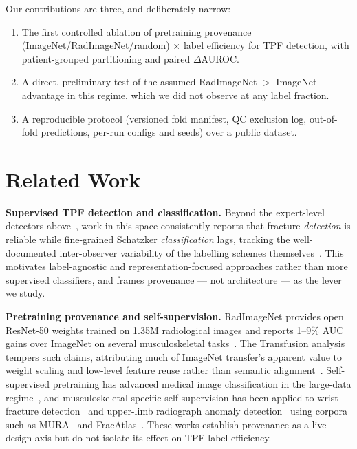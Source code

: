 \documentclass[conference]{IEEEtran}
\begin{document}
Our contributions are three, and deliberately narrow:
\begin{enumerate}
  \item The first controlled ablation of pretraining provenance
  (ImageNet/RadImageNet/random) $\times$ label efficiency for TPF detection, with
  patient-grouped partitioning and paired $\Delta$AUROC.
  \item A direct, preliminary test of the assumed RadImageNet $>$ ImageNet advantage
  in this regime, which we did not observe at any label fraction.
  \item A reproducible protocol (versioned fold manifest, QC exclusion log,
  out-of-fold predictions, per-run configs and seeds) over a public dataset.
\end{enumerate}

\section{Related Work}

\textbf{Supervised TPF detection and classification.} Beyond the expert-level
detectors above~\cite{vandergaast25,huo25}, work in this space consistently reports
that fracture \emph{detection} is reliable while fine-grained Schatzker
\emph{classification} lags, tracking the well-documented inter-observer variability
of the labelling schemes themselves~\cite{vandergaast25}. This motivates
label-agnostic and representation-focused approaches rather than more supervised
classifiers, and frames provenance --- not architecture --- as the lever we study.

\textbf{Pretraining provenance and self-supervision.} RadImageNet provides
open ResNet-50 weights trained on 1.35M radiological images and reports 1--9\% AUC
gains over ImageNet on several musculoskeletal tasks~\cite{mei22radimagenet}. The
Transfusion analysis tempers such claims, attributing much of ImageNet transfer's
apparent value to weight scaling and low-level feature reuse rather than semantic
alignment~\cite{raghu19transfusion}. Self-supervised pretraining has advanced medical
image classification in the large-data regime~\cite{azizi21,chen20simclr}, and
musculoskeletal-specific self-supervision has been applied to wrist-fracture
detection~\cite{thorat24} and upper-limb radiograph anomaly
detection~\cite{spahr21selftaught,ssl2tl} using corpora such as
MURA~\cite{rajpurkar18mura} and FracAtlas~\cite{abedeen23fracatlas}. These works
establish provenance as a live design axis but do not isolate its effect on TPF
label efficiency.
\end{document}
